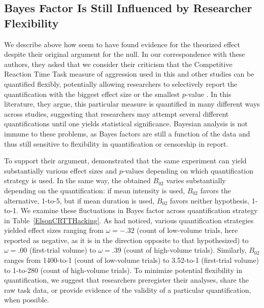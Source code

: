 \documentclass[man]{apa6}
\begin{document}
\subsection{Bayes Factor Is Still Influenced by Researcher Flexibility} 
We describe above how \citet{Elson:etal:2013} seem to have found evidence for the theorized effect despite their original argument for the null. In our correspondence with these authors, they asked that we consider their criticism that the Competitive Reaction Time Task measure of aggression used in this and other studies can be quantified flexibly, potentially allowing researchers to selectively report the quantification with the biggest effect size or the smallest $p$-value \citep{Elson:etal:2014}. In this literature, they argue, this particular measure is quantified in many different ways across studies, suggesting that researchers may attempt several different quantifications until one yields statistical significance. Bayesian analysis is not immune to these problems, as Bayes factors are still a function of the data and thus still sensitive to flexibility in quantification or censorship in report. 

To support their argument, \citet{Elson:etal:2014} demonstrated that the same experiment can yield substantially various effect sizes and $p$-values depending on which quantification strategy is used. In the same way, the obtained $B_{02}$ varies substantially depending on the quantification: if mean intensity is used, $B_{02}$ favors the alternative, 1-to-5, but if mean duration is used, $B_{02}$ favors neither hypothesis, 1-to-1. We examine these fluctuations in Bayes factor across quantification strategy in Table~\ref{ElsonCRTTHacking}.  As \citet{Elson:etal:2014} had noticed, various quantification strategies yielded effect sizes ranging from $\omega = -.32$ (count of low-volume trials, here reported as negative, as it is in the direction opposite to that hypothesized) to $\omega = .00$ (first-trial volume) to $\omega = .39$ (count of high-volume trials). Similarly, $B_{02}$ ranges from 1400-to-1 (count of low-volume trials) to 3.52-to-1 (first-trial volume) to 1-to-280 (count of high-volume trials). To minimize potential flexibility in quantification, we suggest that researchers preregister their analyses, share the raw task data, or provide evidence of the validity of a particular quantification, when possible. 
\end{document}

